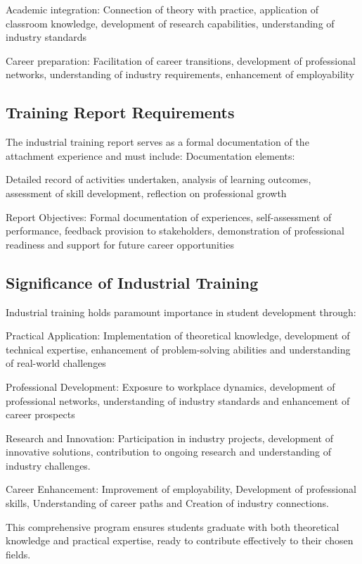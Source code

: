 Academic integration: Connection of theory with practice, application of classroom knowledge, development of research capabilities, understanding of industry standards

Career preparation: Facilitation of career transitions, development of professional networks, understanding of industry requirements, enhancement of employability

\subsection{Training Report Requirements}
The industrial training report serves as a formal documentation of the attachment experience and must include:
Documentation elements:

Detailed record of activities undertaken, analysis of learning outcomes, assessment of skill development, reflection on professional growth

Report Objectives: Formal documentation of experiences, self-assessment of performance, feedback provision to stakeholders, demonstration of professional readiness and support for future career opportunities

\subsection{Significance of Industrial Training}
Industrial training holds paramount importance in student development through:

Practical Application: Implementation of theoretical knowledge, development of technical expertise, enhancement of problem-solving abilities and understanding of real-world challenges

Professional Development: Exposure to workplace dynamics, development of professional networks, understanding of industry standards and enhancement of career prospects

Research and Innovation: Participation in industry projects, development of innovative solutions, contribution to ongoing research and understanding of industry challenges.

Career Enhancement: Improvement of employability, Development of professional skills, Understanding of career paths and Creation of industry connections.

This comprehensive program ensures students graduate with both theoretical knowledge and practical expertise, ready to contribute effectively to their chosen fields.